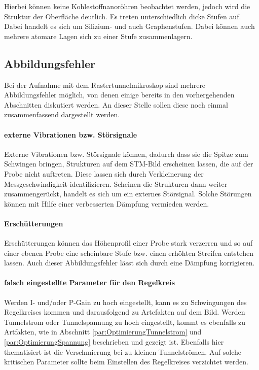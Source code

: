 \documentclass[a4paper,twoside,final]{article}
\begin{document}
Hierbei können keine Kohlestoffnanoröhren beobachtet werden, jedoch wird die Struktur der Oberfläche deutlich. Es treten unterschiedlich dicke Stufen auf. Dabei handelt es sich um Silizium- und auch Graphenstufen. Dabei können auch mehrere atomare Lagen sich zu einer Stufe zusammenlagern.

\subsection{Abbildungsfehler}
Bei der Aufnahme mit dem Rastertunnelmikroskop sind mehrere Abbildungsfehler möglich, von denen einige bereits in den vorhergehenden Abschnitten diskutiert werden. An dieser Stelle sollen diese noch einmal zusammenfassend dargestellt werden.
\paragraph{externe Vibrationen bzw. Störsignale}
Externe Vibrationen bzw. Störsignale können, dadurch dass sie die Spitze zum Schwingen bringen, Strukturen auf dem STM-Bild erscheinen lassen, die auf der Probe nicht auftreten. Diese lassen sich durch Verkleinerung der Messgeschwindigkeit identifizieren. Scheinen die Strukturen dann weiter zusammengerückt, handelt es sich um ein externes Störsignal. Solche Störungen können mit Hilfe einer verbesserten Dämpfung vermieden werden.

\paragraph{Erschütterungen}
Erschütterungen können das Höhenprofil einer Probe stark verzerren und so auf einer ebenen Probe eine scheinbare Stufe bzw. einen erhöhten Streifen entstehen lassen. Auch dieser Abbildungsfehler lässt sich durch eine Dämpfung korrigieren.

\paragraph{falsch eingestellte Parameter für den Regelkreis}
Werden I- und/oder P-Gain zu hoch eingestellt, kann es zu Schwingungen des Regelkreises kommen und darausfolgend zu Artefakten auf dem Bild. Werden Tunnelstrom oder Tunnelspannung zu hoch eingestellt, kommt es ebenfalls zu Artfakten, wie in Abschnitt \ref{par:OptimierungTunnelstrom} und \ref{par:OptimierungSpannung} beschrieben und gezeigt ist. Ebenfalls hier thematisiert ist die Verschmierung bei zu kleinen Tunnelströmen. Auf solche kritischen Parameter sollte beim Einstellen des Regelkreises verzichtet werden.
\end{document}

